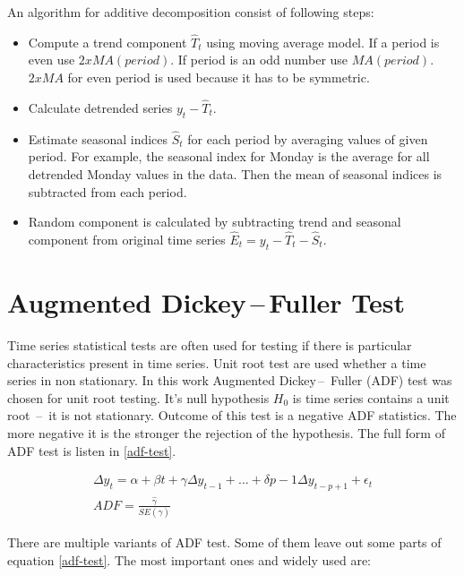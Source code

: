     An algorithm for additive decomposition consist of following steps:

    \begin{itemize}
        \item Compute a trend component $\hat{T}_t$ using moving average model. If a period is even use
        $2 x MA(period)$. If period is an odd number use $MA(period)$. $2 x MA$ for even period is used because it
        has to be symmetric.
        \item Calculate detrended series $y_t - \hat{T}_t$.
        \item Estimate seasonal indices $\hat{S}_t$ for each period by averaging values of given period. For example,
         the seasonal index for Monday is the average for all detrended Monday values in the data. Then the mean of
         seasonal indices is subtracted from each period.
        \item Random component is calculated by subtracting trend and seasonal component from original time series
            $\hat{E}_t = y_t - \hat{T}_t - \hat{S}_t$.
    \end{itemize}

    \section{Augmented Dickey\,--\,Fuller Test}
    Time series statistical tests are often used for testing if there is particular characteristics present in time
    series. Unit root test are used whether a time series in non stationary. In this work Augmented Dickey\,--\,
    Fuller (ADF) test was chosen for unit root testing. It's null hypothesis $H_0$ is time series contains a
    unit root \,--\, it is not stationary. Outcome of this test is a negative ADF statistics. The more negative it is
    the stronger the rejection of the hypothesis. The full form of ADF test is listen in \ref{adf-test}.

    \begin{eqnarray} \label{adf-test}
        \Delta y_t = \alpha + \beta t + \gamma \Delta y_{t-1} + \dots + \delta{p-1} \Delta y_{t-p+1} + \epsilon_t \\
        ADF = \frac{\hat{\gamma}}{SE(\hat{\gamma})} \label{adf-stat}
    \end{eqnarray}

    There are multiple variants of ADF test. Some of them leave out some parts of equation \ref{adf-test}.
    The most important ones and widely used are:

